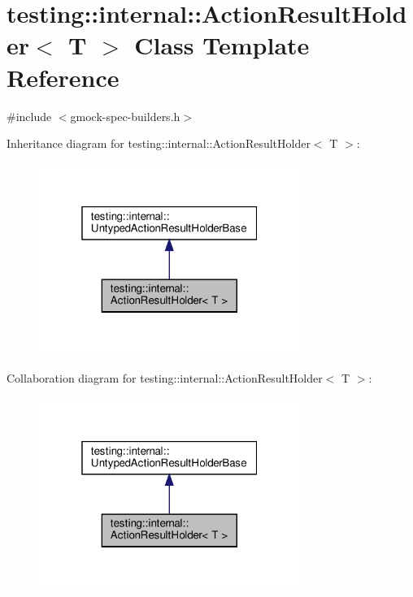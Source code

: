 \hypertarget{classtesting_1_1internal_1_1_action_result_holder}{}\section{testing\+:\+:internal\+:\+:Action\+Result\+Holder$<$ T $>$ Class Template Reference}
\label{classtesting_1_1internal_1_1_action_result_holder}


{\ttfamily \#include $<$gmock-\/spec-\/builders.\+h$>$}



Inheritance diagram for testing\+:\+:internal\+:\+:Action\+Result\+Holder$<$ T $>$\+:
\nopagebreak
\begin{figure}[H]
\begin{center}
\leavevmode
\includegraphics[width=241pt]{classtesting_1_1internal_1_1_action_result_holder__inherit__graph}
\end{center}
\end{figure}


Collaboration diagram for testing\+:\+:internal\+:\+:Action\+Result\+Holder$<$ T $>$\+:
\nopagebreak
\begin{figure}[H]
\begin{center}
\leavevmode
\includegraphics[width=241pt]{classtesting_1_1internal_1_1_action_result_holder__coll__graph}
\end{center}
\end{figure}
